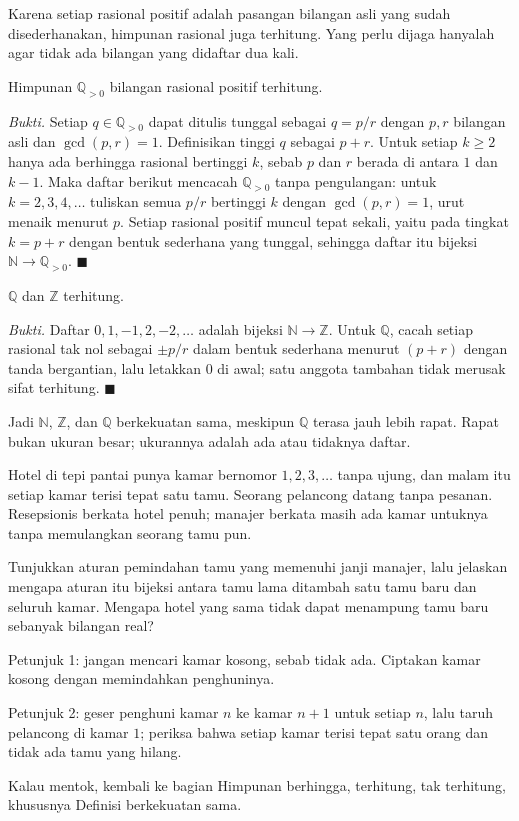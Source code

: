 Karena setiap rasional positif adalah pasangan bilangan asli yang sudah
disederhanakan, himpunan rasional juga terhitung. Yang perlu dijaga hanyalah agar
tidak ada bilangan yang didaftar dua kali.

\begin{proposisi}
Himpunan $\mathbb{Q}_{>0}$ bilangan rasional positif terhitung.
\end{proposisi}
\par\smallskip\noindent\textit{Bukti.} Setiap $q \in \mathbb{Q}_{>0}$ dapat ditulis
tunggal sebagai $q = p/r$ dengan $p, r$ bilangan asli dan $\gcd(p,r) = 1$. Definisikan
tinggi $q$ sebagai $p + r$. Untuk setiap $k \ge 2$ hanya ada berhingga rasional
bertinggi $k$, sebab $p$ dan $r$ berada di antara $1$ dan $k-1$. Maka daftar berikut
mencacah $\mathbb{Q}_{>0}$ tanpa pengulangan: untuk $k = 2, 3, 4, \dots$ tuliskan
semua $p/r$ bertinggi $k$ dengan $\gcd(p,r) = 1$, urut menaik menurut $p$. Setiap
rasional positif muncul tepat sekali, yaitu pada tingkat $k = p + r$ dengan bentuk
sederhana yang tunggal, sehingga daftar itu bijeksi $\mathbb{N} \to \mathbb{Q}_{>0}$.
\hfill$\blacksquare${\parfillskip=0pt\par}

\begin{akibat}
$\mathbb{Q}$ dan $\mathbb{Z}$ terhitung.
\end{akibat}
\par\smallskip\noindent\textit{Bukti.} Daftar $0, 1, -1, 2, -2, \dots$ adalah
bijeksi $\mathbb{N} \to \mathbb{Z}$. Untuk $\mathbb{Q}$, cacah setiap rasional tak
nol sebagai $\pm p/r$ dalam bentuk sederhana menurut $(p+r)$ dengan tanda bergantian,
lalu letakkan $0$ di awal; satu anggota tambahan tidak merusak sifat terhitung.
\hfill$\blacksquare${\parfillskip=0pt\par}

Jadi $\mathbb{N}$, $\mathbb{Z}$, dan $\mathbb{Q}$ berkekuatan sama, meskipun
$\mathbb{Q}$ terasa jauh lebih rapat. Rapat bukan ukuran besar; ukurannya adalah ada
atau tidaknya daftar.

\begin{tantangan}
Hotel di tepi pantai punya kamar bernomor $1, 2, 3, \dots$ tanpa ujung, dan malam
itu setiap kamar terisi tepat satu tamu. Seorang pelancong datang tanpa pesanan.
Resepsionis berkata hotel penuh; manajer berkata masih ada kamar untuknya tanpa
memulangkan seorang tamu pun.

Tunjukkan aturan pemindahan tamu yang memenuhi janji manajer, lalu jelaskan mengapa
aturan itu bijeksi antara tamu lama ditambah satu tamu baru dan seluruh kamar.
Mengapa hotel yang sama tidak dapat menampung tamu baru sebanyak bilangan real?

Petunjuk 1: jangan mencari kamar kosong, sebab tidak ada. Ciptakan kamar kosong dengan
memindahkan penghuninya.

Petunjuk 2: geser penghuni kamar $n$ ke kamar $n+1$ untuk setiap $n$, lalu taruh
pelancong di kamar $1$; periksa bahwa setiap kamar terisi tepat satu orang dan tidak
ada tamu yang hilang.

Kalau mentok, kembali ke bagian Himpunan berhingga, terhitung, tak terhitung,
khususnya Definisi berkekuatan sama.
\end{tantangan}

